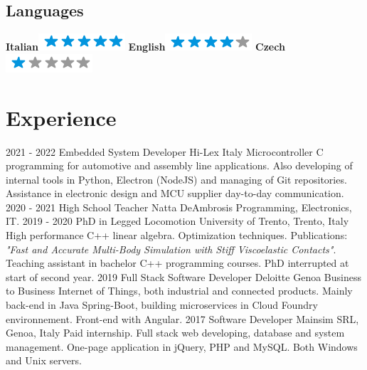 \documentclass[]{friggeri-cv}
\begin{document}
\begin{aside}
  \section{Languages}
    \textbf{Italian}\includegraphics[scale=0.40]{img/5stars.png}
    \textbf{English}\includegraphics[scale=0.40]{img/4stars.png}
    \textbf{Czech}\includegraphics[scale=0.40]{img/1stars.png}    
\end{aside}

\section{Experience}
\begin{entrylist}
  \entry
  {2021 - 2022}
  {Embedded System Developer}
  {Hi-Lex Italy}
  {Microcontroller C programming for automotive and assembly line applications. Also developing of internal tools in Python, Electron (NodeJS) and managing of Git repositories. Assistance in electronic design and MCU supplier day-to-day communication.}
  \entry
	{2020 - 2021}
	{High School Teacher}
	{Natta DeAmbrosis}
	{Programming, Electronics, IT.}
  \entry
	{2019 - 2020}
	{PhD in Legged Locomotion}
	{University of Trento, Trento, Italy}
	{High performance C++ linear algebra. Optimization techniques. Publications: \textit{"Fast and Accurate Multi-Body Simulation with Stiff Viscoelastic Contacts"}. Teaching assistant in bachelor C++ programming courses. PhD interrupted at start of second year.}
  \entry
	{2019}
	{Full Stack Software Developer}
	{Deloitte Genoa}
	{Business to Business Internet of Things, both industrial and connected products. Mainly back-end in Java Spring-Boot, building microservices in Cloud Foundry environnement. Front-end with Angular. }
  \entry
    {2017}
    {Software Developer}
    {Mainsim SRL, Genoa, Italy}
    {Paid internship. Full stack web developing, database and system management. One-page application in jQuery, PHP and MySQL. Both Windows and Unix servers.}
\end{entrylist}
\end{document}
